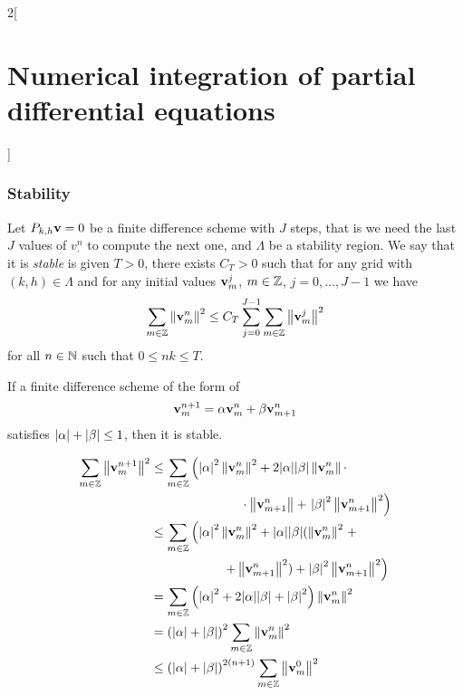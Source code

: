 \documentclass[../../../main_math.tex]{subfiles}
\begin{document}
\begin{multicols}{2}[\section{Numerical integration of partial differential equations}]
  \subsubsection{Stability}
  \begin{definition}
    Let $P_{k,h}\boldsymbol{\mathrm{v}}=0$ be a finite difference scheme with $J$ steps, that is we need the last $J$ values of $v_{\cdot}^n$ to compute the next one, and $\Lambda$ be a stability region. We say that it is \emph{stable} is given $T>0$, there exists $C_T>0$ such that for any grid with $(k,h)\in \Lambda$ and for any initial values $\boldsymbol{\mathrm{v}}_m^j$, $m\in\mathbb{Z}$, $j=0,\ldots,J-1$ we have $$\sum_{m\in\mathbb{Z}}\left\|\boldsymbol{\mathrm{v}}_m^n\right\|^2\leq C_T\sum_{j=0}^{J-1}\sum_{m\in\mathbb{Z}}\left\|\boldsymbol{\mathrm{v}}_m^j\right\|^2$$ for all $n\in\mathbb{N}$ such that $0\leq nk\leq T$.
  \end{definition}
  \begin{lemma}
    If a finite difference scheme of the form of $$\boldsymbol{\mathrm{v}}_m^{n+1}=\alpha \boldsymbol{\mathrm{v}}_m^n+\beta \boldsymbol{\mathrm{v}}_{m+1}^n$$ satisfies $\abs{\alpha}+\abs{\beta}\leq 1$, then it is stable.
  \end{lemma}
  \begin{sproof}
    \begin{align*}
      \sum_{m\in\ZZ}\norm{\vf{v}_m^{n+1}}^2 & \leq \sum_{m\in\ZZ}\left(\abs{\alpha}^2\norm{\vf{v}_m^n}^2+2\abs{\alpha}\abs{\beta}\norm{\vf{v}_m^n}\cdot\right. \\
                                            & \hspace{2.5cm}\cdot\norm{\vf{v}_{m+1}^n}+\left.\abs{\beta}^2\norm{\vf{v}_{m+1}^n}^2\right)                       \\
                                            & \leq \sum_{m\in\ZZ}\left(\abs{\alpha}^2\norm{\vf{v}_m^n}^2+\abs{\alpha}\abs{\beta}(\norm{\vf{v}_m^n}^2 \right.+  \\
                                            & \hspace{2cm}\left.+\norm{\vf{v}_{m+1}^n}^2)+\abs{\beta}^2\norm{\vf{v}_{m+1}^n}^2\right)                          \\
                                            & = \sum_{m\in\ZZ}\left(\abs{\alpha}^2+2\abs{\alpha}\abs{\beta}+\abs{\beta}^2\right)\norm{\vf{v}_{m}^n}^2          \\
                                            & ={(\abs{\alpha}+\abs{\beta})}^2 \sum_{m\in\ZZ}\norm{\vf{v}_{m}^n}^2                                              \\
                                            & \leq{(\abs{\alpha}+\abs{\beta})}^{2(n+1)} \sum_{m\in\ZZ}\norm{\vf{v}_{m}^0}^2

\end{align*}
\end{sproof}
\end{multicols}
\end{document}

